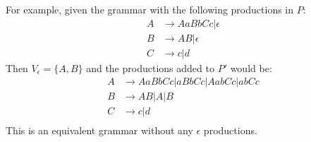 For example, given the grammar with the following productions in $P$:
\begin{align*}
A &\to AaBbCc | \epsilon \\
B &\to AB | \epsilon \\
C &\to c | d
\end{align*}
Then $V_\epsilon = \{A, B\}$ and the productions added to $P'$ would be:
\begin{align*}
A &\to AaBbCc | aBbCc | AabCc | abCc \\
B &\to AB | A | B \\
C &\to c | d \\
\end{align*}
This is an equivalent grammar without any $\epsilon$ productions.


